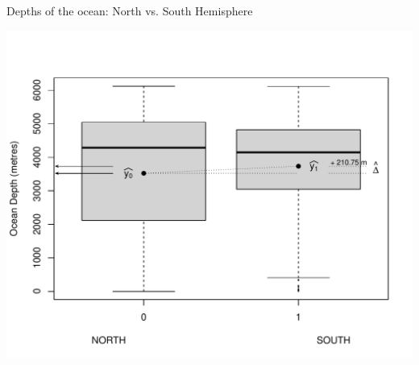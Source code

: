 \documentclass[10pt,handout]{beamer}\usepackage[]{graphicx}\usepackage[]{color}
\makeatletter
\def\maxwidth{ %
  \ifdim\Gin@nat@width>\linewidth
    \linewidth
  \else
    \Gin@nat@width
  \fi
}
\newenvironment{knitrout}{}{} %
\makeatother
\begin{document}
\begin{frame}[fragile]{Depths of the ocean: North vs. South Hemisphere}
	
\begin{knitrout}\tiny
{}\color{fgcolor}

{\centering \includegraphics[width=\maxwidth]{figure/unnamed-chunk-6-1} 

}



\end{knitrout}
	
	
\end{frame}
\end{document}
